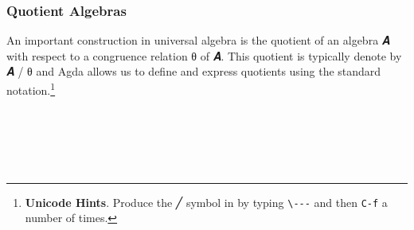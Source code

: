 \subsubsection{Quotient Algebras}\label{quotient-algebras}
An important construction in universal algebra is the quotient of an algebra \ab 𝑨 with respect to a congruence relation \ab θ of \ab 𝑨. This quotient is typically denote by \ab 𝑨 \af / \ab θ and Agda allows us to define and express quotients using the standard notation.\footnote{%
\textbf{Unicode Hints}. Produce the ╱ symbol in \agdamode by typing \texttt{\textbackslash{}-\/-\/-} and then \texttt{C-f} a number of times.}
\ccpad
\begin{code}%
\>[0]\AgdaSpace{}%
\AgdaSymbol{:}\AgdaSpace{}%
\AgdaSymbol{\{}\AgdaSpace{}%
\AgdaSpace{}%
\AgdaSymbol{:}\AgdaSpace{}%
\AgdaSymbol{\}(}\AgdaSpace{}%
\AgdaSymbol{:}\AgdaSpace{}%
\AgdaSpace{}%
\AgdaSpace{}%
\AgdaSymbol{)}\AgdaSpace{}%
\AgdaSpace{}%
\AgdaSymbol{\{}\AgdaSymbol{\}\{}\AgdaSymbol{\}}\AgdaSpace{}%
\AgdaSpace{}%
\AgdaSpace{}%
\AgdaSpace{}%
\AgdaSymbol{(}\AgdaSpace{}%
\AgdaSpace{}%
\AgdaSpace{}%
\AgdaSymbol{)}\AgdaSpace{}%
\<%
\\
%
\\[\AgdaEmptyExtraSkip]%
\>[0]\AgdaSpace{}%
\AgdaSpace{}%
\AgdaSpace{}%
\AgdaSymbol{=}%
\>[228I]\AgdaSymbol{(}\AgdaSpace{}%
\AgdaSpace{}%
\AgdaSpace{}%
\AgdaSpace{}%
\AgdaOperator{\AgdaFunction{/}}\AgdaSpace{}%
\AgdaSpace{}%
\AgdaSpace{}%
\AgdaSpace{}%
\AgdaSymbol{)}\AgdaSpace{}%
\AgdaOperator{\AgdaInductiveConstructor{,}}%
\>[48]\<%
\\
%
\\[\AgdaEmptyExtraSkip]%
\>[.][@{}l@{}]\<[228I]%
\>[8]\AgdaSpace{}%
\AgdaSpace{}%
\AgdaSpace{}%
\AgdaSpace{}%
\AgdaSpace{}%
\AgdaSymbol{(}\AgdaSpace{}%
\AgdaSpace{}%
\AgdaSymbol{)}\AgdaSpace{}%
\AgdaSpace{}%
\AgdaSpace{}%
\AgdaSpace{}%
\AgdaSpace{}%
\AgdaSpace{}%
\AgdaSpace{}%
\AgdaSpace{}%
\AgdaSpace{}%
\AgdaSymbol{)}\AgdaSpace{}%
%
\>[49]\<%
\end{code}

